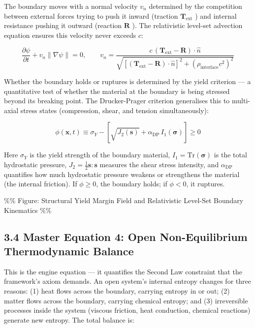 \documentclass[11pt,a4paper]{article}
\theoremstyle{definition}\newtheorem{definition}{Definition}
\theoremstyle{remark}\newtheorem{remark}{Remark}
\begin{document}
The boundary moves with a normal velocity $v_n$ determined by the competition between external forces trying to push it inward (traction $\mathbf{T}_{\text{ext}}$ ) and internal resistance pushing it outward (reaction $\mathbf{R}$ ). The relativistic level-set advection equation ensures this velocity never exceeds $c$:


\begin{equation}
\boxed{\frac{\partial \psi}{\partial t} + v_n \|\nabla \psi\| = 0, \qquad v_n = \frac{c \, (\mathbf{T}_{\text{ext}} - \mathbf{R}) \cdot \hat{n}}{\sqrt{[(\mathbf{T}_{\text{ext}} - \mathbf{R}) \cdot \hat{n}]^2 + (\rho_{\text{interface}} c^2)^2}}}
\end{equation}


Whether the boundary holds or ruptures is determined by the yield criterion — a quantitative test of whether the material at the boundary is being stressed beyond its breaking point. The Drucker-Prager criterion generalises this to multi-axial stress states (compression, shear, and tension simultaneously):


\begin{equation}
\boxed{\phi(\mathbf{x}, t) \equiv \sigma_Y - \left[ \sqrt{J_2(\mathbf{s})} + \alpha_{\text{DP}} \, I_1(\boldsymbol{\sigma}) \right] \ge 0}
\end{equation}


Here $\sigma_Y$ is the yield strength of the boundary material, $I_1 = \mathrm{Tr}(\boldsymbol{\sigma})$ is the total hydrostatic pressure, $J_2 = \frac{1}{2}\mathbf{s}:\mathbf{s}$ measures the shear stress intensity, and $\alpha_{\text{DP}}$ quantifies how much hydrostatic pressure weakens or strengthens the material (the internal friction). If $\phi \ge 0$, the boundary holds; if $\phi < 0$, it ruptures.

\%\% Figure: Structural Yield Margin Field and Relativistic Level-Set Boundary Kinematics \%\%
\subsection{3.4 Master Equation 4: Open Non-Equilibrium Thermodynamic Balance}

This is the engine equation — it quantifies the Second Law constraint that the framework's axiom demands. An open system's internal entropy changes for three reasons: (1) heat flows across the boundary, carrying entropy in or out; (2) matter flows across the boundary, carrying chemical entropy; and (3) irreversible processes inside the system (viscous friction, heat conduction, chemical reactions) generate new entropy. The total balance is:
\end{document}
